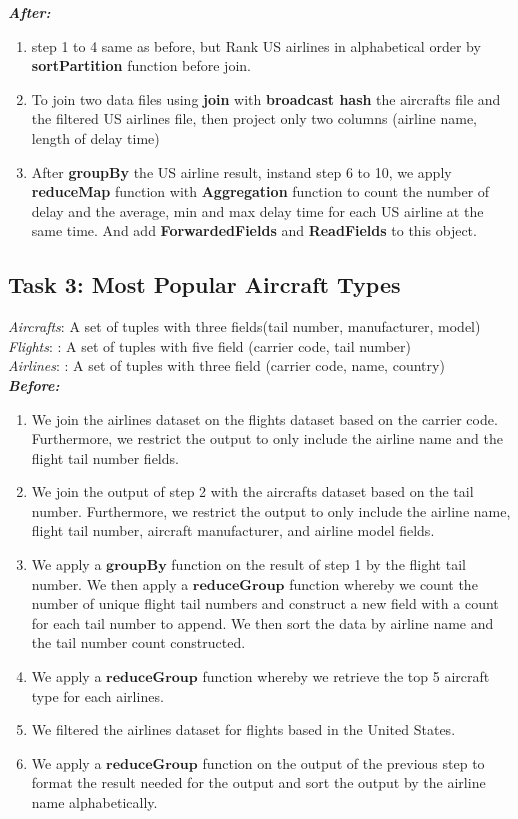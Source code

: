 \documentclass[12pt]{article}
\begin{document}
\textbf{\textit{After:}} 

\begin{enumerate}
\item step 1 to 4 same as before, but Rank US airlines in alphabetical order by \textbf{sortPartition} function before join.

\item To join two data files using \textbf{join} with \textbf{broadcast hash} the aircrafts file and the filtered US airlines file, then project only two columns (airline name, length of delay time)

\item After \textbf{groupBy} the US airline result, instand step 6 to 10, we apply \textbf{reduceMap} function with \textbf{Aggregation} function to count the number of delay and the average, min and max delay time for each US airline at the same time. And add \textbf{ForwardedFields} and \textbf{ReadFields} to this object.

\end{enumerate}

\subsection*{Task 3: Most Popular Aircraft Types}
\textit{Aircrafts}: A set of tuples with three fields(tail number, manufacturer, model)\\
\textit{Flights}: : A set of tuples with five field (carrier code, tail number)\\
\textit{Airlines}: : A set of tuples with three field (carrier code, name, country)\\

\textbf{\textit{Before:}} 
\begin{enumerate}
    \item We join the airlines dataset on the flights dataset based on the carrier code. Furthermore, we restrict the output to only include the airline name and the flight tail number fields.
    \item We join the output of step 2 with the aircrafts dataset based on the tail number. Furthermore, we restrict the output to only include the airline name, flight tail number, aircraft manufacturer, and airline model fields.
    \item We apply a $\textbf{groupBy}$ function on the result of step 1 by the flight tail number. We then apply a $\textbf{reduceGroup}$ function whereby we count the number of unique flight tail numbers and construct a new field with a count for each tail number to append. We then sort the data by airline name and the tail number count constructed.
    \item We apply a $\textbf{reduceGroup}$ function whereby we retrieve the top 5 aircraft type for each airlines.
    \item We filtered the airlines dataset for flights based in the United States.
    \item We apply a $\textbf{reduceGroup}$ function on the output of the previous step to format the result needed for the output and sort the output by the airline name alphabetically.\end{enumerate}
\end{document}
